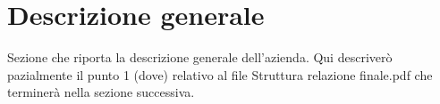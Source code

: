 \section{Descrizione generale}

Sezione che riporta la descrizione generale dell'azienda.
Qui descriverò pazialmente il punto 1 (dove) relativo al file Struttura relazione finale.pdf che terminerà nella sezione successiva.